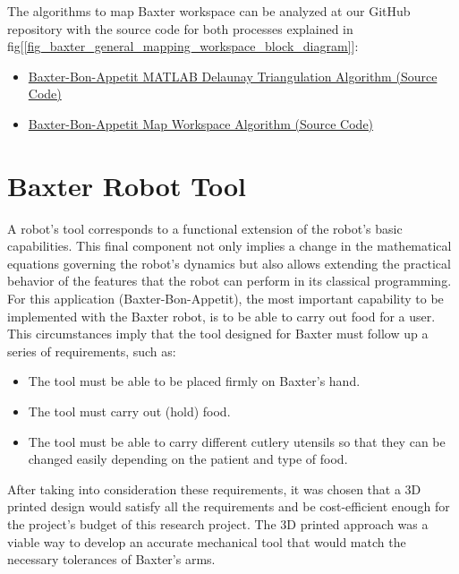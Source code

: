 \documentclass[11pt]{report} %
\begin{document}
The algorithms to map Baxter workspace can be analyzed at our GitHub repository  with the source code for both processes explained in fig[\ref{fig_baxter_general_mapping_workspace_block_diagram}]:\\

\begin{itemize}
    \color{blue}
    \item \href{https://github.com/san99tiago/baxter-bon-appetit/blob/main/matlab/Baxter_Workspace.m}{Baxter-Bon-Appetit MATLAB Delaunay Triangulation Algorithm (Source Code)}
    \color{blue}
    \item \href{https://github.com/san99tiago/baxter-bon-appetit/blob/main/python/baxter_bon_appetit/scripts/map_workspace.py}{Baxter-Bon-Appetit Map Workspace Algorithm (Source Code)}
\end{itemize}


\section{Baxter Robot Tool}

A robot's tool corresponds to a functional extension of the robot's basic capabilities. This final component not only implies a change in the mathematical equations governing the robot's dynamics but also allows extending the practical behavior of the features that the robot can perform in its classical programming.\\

For this application (Baxter-Bon-Appetit), the most important capability to be implemented with the Baxter robot, is to be able to carry out food for a user. This circumstances imply that the tool designed for Baxter must follow up a series of requirements, such as:

\begin{itemize}
    \item The tool must be able to be placed firmly on Baxter's hand.
    \item The tool must carry out (hold) food.
    \item The tool must be able to carry different cutlery utensils so that they can be changed easily depending on the patient and type of food. 
\end{itemize}

After taking into consideration these requirements, it was chosen that a 3D printed design would satisfy all the requirements and be cost-efficient enough for the project's budget of this research project. The 3D printed approach was a viable way to develop an accurate mechanical tool that would match the necessary tolerances of Baxter's arms.\\
\end{document}
